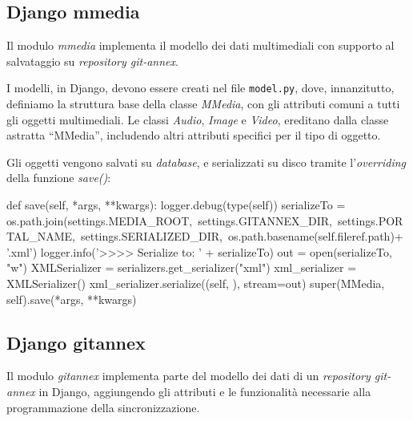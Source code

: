 \subsection{Django mmedia}

Il modulo \emph{mmedia} implementa il modello dei dati
multimediali con supporto al salvataggio su \emph{repository
  git-annex}.

I modelli, in Django, devono essere creati nel file \verb|model.py|,
dove, innanzitutto, definiamo la struttura base della classe
\emph{MMedia}, con gli attributi comuni a tutti gli oggetti
multimediali. Le classi \emph{Audio}, \emph{Image} e \emph{Video},
ereditano dalla classe astratta ``MMedia'', includendo altri attributi
specifici per il tipo di oggetto.

Gli oggetti vengono salvati su \emph{database}, e serializzati su
disco tramite l'\emph{overriding} della funzione \emph{save()}:

\begin{code}
    def save(self, *args, **kwargs):
        logger.debug(type(self))
        serializeTo = os.path.join(settings.MEDIA_ROOT,\
                                   settings.GITANNEX_DIR,\
                                   settings.PORTAL_NAME,\
                                   settings.SERIALIZED_DIR,\
                                   os.path.basename(self.fileref.path)+ '.xml')
        logger.info('>>>> Serialize to: ' + serializeTo)
        out = open(serializeTo, "w")
        XMLSerializer = serializers.get_serializer("xml")
        xml_serializer = XMLSerializer()
        xml_serializer.serialize((self, ), stream=out)
        super(MMedia, self).save(*args, **kwargs)
\end{code}

\subsection{Django gitannex}

Il modulo \emph{gitannex} implementa parte del modello dei dati di un
\emph{repository git-annex} in Django, aggiungendo gli attributi e le
funzionalità necessarie alla programmazione della sincronizzazione.

